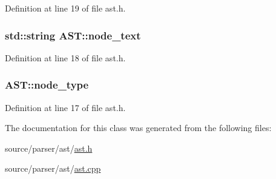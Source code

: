Definition at line 19 of file ast.h.

\hypertarget{class_a_s_t_a1638e0900cea081df5bb23d76432a2c3}{
\subsubsection[{node\_\-text}]{\setlength{\rightskip}{0pt plus 5cm}std::string {\bf AST::node\_\-text}}}
\label{class_a_s_t_a1638e0900cea081df5bb23d76432a2c3}


Definition at line 18 of file ast.h.

\hypertarget{class_a_s_t_aa650b2056cd9f76cc9b8833ca5faf312}{
\subsubsection[{node\_\-type}]{ {\bf AST::node\_\-type}}}
\label{class_a_s_t_aa650b2056cd9f76cc9b8833ca5faf312}


Definition at line 17 of file ast.h.



The documentation for this class was generated from the following files:\begin{DoxyCompactItemize}
\item 
source/parser/ast/\hyperlink{ast_8h}{ast.h}\item 
source/parser/ast/\hyperlink{ast_8cpp}{ast.cpp}\end{DoxyCompactItemize}
